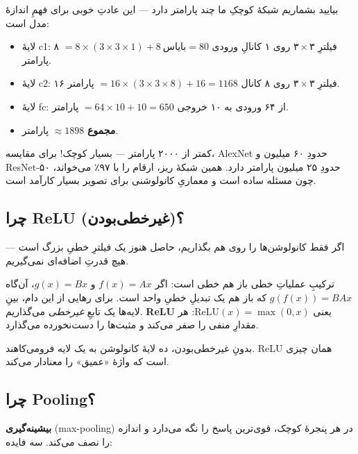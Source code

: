 \documentclass[12pt,a4paper]{article}
\begin{document}
بیایید بشماریم شبکهٔ کوچکِ ما چند پارامتر دارد — این عادتِ خوبی برای فهمِ اندازهٔ مدل است:

\begin{riyazi}
\begin{itemize}
  \item لایهٔ c1: ۸ فیلترِ $۳\times۳$ روی ۱ کانالِ ورودی $= 8\times(3\times3\times1) + 8\ \text{بایاس} = 80$ پارامتر.
  \item لایهٔ c2: ۱۶ فیلترِ $۳\times۳$ روی ۸ کانال $= 16\times(3\times3\times8) + 16 = 1168$ پارامتر.
  \item لایهٔ fc: از ۶۴ ورودی به ۱۰ خروجی $= 64\times10 + 10 = 650$ پارامتر.
  \item \textbf{مجموع} $\approx 1898$ پارامتر.
\end{itemize}
\end{riyazi}

\begin{nokte}
کمتر از ۲۰۰۰ پارامتر — بسیار کوچک! برای مقایسه، AlexNet حدودِ ۶۰ میلیون و ResNet-۵۰ حدودِ ۲۵ میلیون پارامتر دارد. همین شبکهٔ ریز، ارقام را با ۹۷٪ می‌خواند، چون مسئله ساده است و معماریِ کانولوشنی برای تصویر بسیار کارآمد است.
\end{nokte}

\subsection{چرا ReLU (غیرخطی‌بودن)؟}

اگر فقط کانولوشن‌ها را روی هم بگذاریم، حاصل هنوز یک فیلترِ خطیِ بزرگ است — هیچ قدرتِ اضافه‌ای نمی‌گیریم.

\begin{riyazi}
ترکیبِ عملیاتِ خطی باز هم خطی است: اگر $f(x)=Ax$ و $g(x)=Bx$، آن‌گاه $g(f(x))=BAx$ که باز هم یک تبدیلِ خطیِ واحد است. برای رهایی از این دام، بینِ لایه‌ها یک تابعِ \emph{غیرخطی} می‌گذاریم. \textbf{ReLU} یعنی $\mathrm{ReLU}(x)=\max(0,x)$: هر مقدارِ منفی را صفر می‌کند و مثبت‌ها را دست‌نخورده می‌گذارد.
\end{riyazi}

\begin{nokte}
بدونِ غیرخطی‌بودن، ده لایهٔ کانولوشن به یک لایه فرومی‌کاهند. ReLU همان چیزی است که واژهٔ «عمیق» را معنادار می‌کند.
\end{nokte}

\subsection{چرا Pooling؟}

\textbf{بیشینه‌گیری} (max-pooling) در هر پنجرهٔ کوچک، قوی‌ترین پاسخ را نگه می‌دارد و اندازه را نصف می‌کند. سه فایده:
\end{document}
